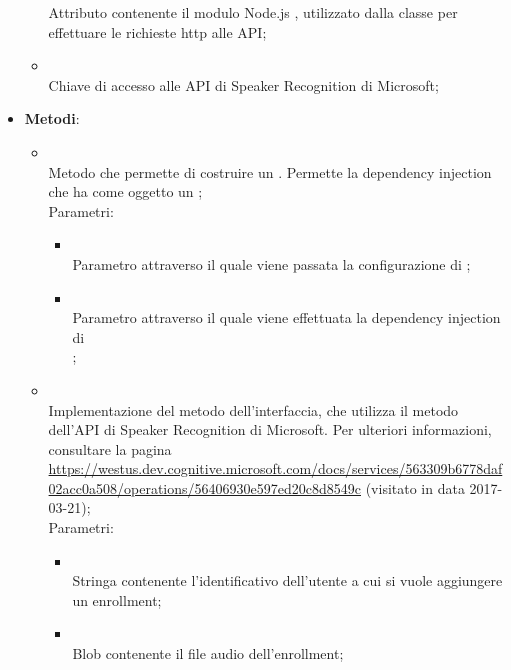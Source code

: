 \begin{itemize}
\begin{itemize}
		Attributo contenente il modulo Node.js , utilizzato dalla classe per effettuare le richieste http alle API;
		\item[]  \\
		Chiave di accesso alle API di Speaker Recognition di Microsoft;
	\end{itemize}
	\item \textbf{Metodi}:
	\begin{itemize}
		\item[]  \\		Metodo che permette di costruire un . Permette la dependency injection che ha come oggetto un ;\\
		Parametri:
		\begin{itemize}
			\item {} \\
			Parametro attraverso il quale viene passata la configurazione di ;
			\item {} \\
			Parametro attraverso il quale viene effettuata la dependency injection di \\  ;
		\end{itemize}
		\item[]  \\		Implementazione del metodo dell'interfaccia, che utilizza il metodo  dell'API di Speaker Recognition di Microsoft. Per ulteriori informazioni, consultare la pagina \url{https://westus.dev.cognitive.microsoft.com/docs/services/563309b6778daf02acc0a508/operations/56406930e597ed20c8d8549c} (visitato in data 2017-03-21);\\
		Parametri:
		\begin{itemize}
			\item {} \\
			Stringa contenente l'identificativo dell'utente a cui si vuole aggiungere un enrollment;
			\item {} \\
			Blob contenente il file audio dell'enrollment;
		\end{itemize}

\end{itemize}
\end{itemize}
